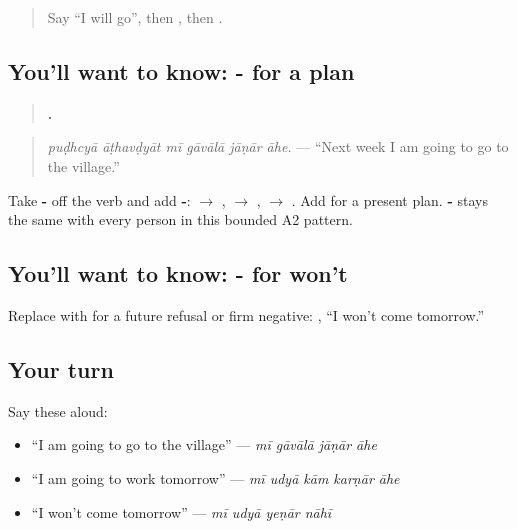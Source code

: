 \label{lesson:MR-C160-janar-ahe}



\begin{quote}
Say \textquotedblleft{}I will go\textquotedblright{}, then \textbf{}, then \textbf{}.
\end{quote}

\subsection*{You'll want to know: -  for a plan}
\begin{quote}
\textbf{     .}
\end{quote}

\begin{quote}
\emph{puḍhcyā āṭhavḍyāt mī gāvālā jāṇār āhe.} — \textquotedblleft{}Next week I am going to go to the village.\textquotedblright{}
\end{quote}

Take \textbf{-} off the verb and add \textbf{-}: \textbf{ $\to$ }, \textbf{ $\to$ }, \textbf{ $\to$ }. Add \textbf{} for a present plan. \textbf{-} stays the same with every person in this bounded A2 pattern.

\subsection*{You'll want to know: -  for won't}
Replace \textbf{} with \textbf{} for a future refusal or firm negative: \textbf{   }, \textquotedblleft{}I won't come tomorrow.\textquotedblright{}

\subsection*{Your turn}
Say these aloud:

\begin{itemize}
\raggedright
  \item \textquotedblleft{}I am going to go to the village\textquotedblright{} — \emph{mī gāvālā jāṇār āhe}
  \item \textquotedblleft{}I am going to work tomorrow\textquotedblright{} — \emph{mī udyā kām karṇār āhe}
  \item \textquotedblleft{}I won't come tomorrow\textquotedblright{} — \emph{mī udyā yeṇār nāhī}
\end{itemize}

